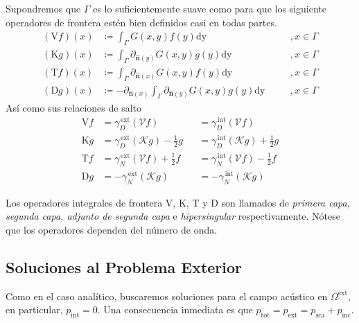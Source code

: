 \documentclass[11pt]{article}
\numberwithin{equation}{section}
\def\n{\hat{\textbf{n}}}
\def\Slpot{\mathcal{V}}
\def\Dlpot{\mathcal{K}}
\def\Slop{\mathrm{V}}
\def\Dlop{\mathrm{K}}
\def\Adlop{\mathrm{T}}
\def\Hop{\mathrm{D}}
\def\traceN{\gamma_{N}}
\def\traceD{\gamma_{D}}
\def\tot{\textrm{tot}}
\def\exterior{\textrm{ext}}
\def\interior{\textrm{int}}
\def\inc{\textrm{inc}}
\def\sca{\textrm{sca}}
\begin{document}
Supondremos que \(\Gamma\) es lo suficientemente suave como para que los
siguiente operadores de frontera estén bien definidos casi en todas partes.
\begin{subequations}\label{operadores integrales de frontera}
\begin{alignat}{4}
\label{op:int:sl}
	(\Slop f)(x) &\coloneqq
	\int_{\Gamma} G(x,y) f(y) \textrm{dy}
	&\quad&, x\in \Gamma\\
\label{op:int:dl}
	(\Dlop g )(x) &\coloneqq
	\int_{\Gamma} \partial_{\n(y)} G(x,y) g(y) \textrm{dy}
	&\quad&, x\in \Gamma\\
\label{op:int:adl}
	(\Adlop f)(x) &\coloneqq
	\int_{\Gamma} \partial_{\n(x)} G(x,y) f(y) \textrm{dy}
	&\quad&, x\in \Gamma\\
\label{op:int:h}
	(\Hop g )(x) &\coloneqq 
	-\partial_{\n(x)} \int_{\Gamma} \partial_{\n(y)} G(x,y) g(y)\textrm{dy}
	&\quad&, x\in \Gamma
\end{alignat}
\end{subequations}
Así como sus relaciones de salto
\begin{subequations}\label{relaciones de salto}
\begin{alignat}{4}
	\Slop f
	&= \traceD^{\,\exterior} \left(\Slpot f\right)
	&&= \traceD^{\,\interior} \left(\Slpot f\right)
	\\
	\Dlop g
	&= \traceD^{\,\exterior} \left(\Dlpot g\right) - \frac{1}{2}g
	&&= \traceD^{\,\interior} \left(\Dlpot g\right) + \frac{1}{2}g
	\\
	\Adlop f
	&= \traceN^{\,\exterior} \left(\Slpot f\right) + \frac{1}{2}f
	&&= \traceN^{\,\interior} \left(\Slpot f\right) - \frac{1}{2}f
	\\
	\Hop g
	&= -\traceN^{\,\exterior} \left( \Dlpot g \right)
	&&= -\traceN^{\,\interior} \left( \Dlpot g \right)
\end{alignat}
\end{subequations}

Los operadores integrales de frontera \(\Slop\), \(\Dlop\), \(\Adlop\) y \(\Hop\) son llamados 
de \textit{primera capa, segunda capa, adjunto de segunda capa} e
\textit{hipersingular} respectivamente. Nótese que los operadores dependen del
número de onda. 

\subsection{Soluciones al Problema Exterior}
\label{ssec:bem:exterior}

Como en el caso analítico, buscaremos soluciones para el campo acústico en
\(\Omega^{\exterior}\), en particular, \(p_{\interior} = 0\). Una consecuencia
inmediata es que \(p_{\tot} = p_{\exterior} = p_{\sca} + p_{\inc}\).
\end{document}
